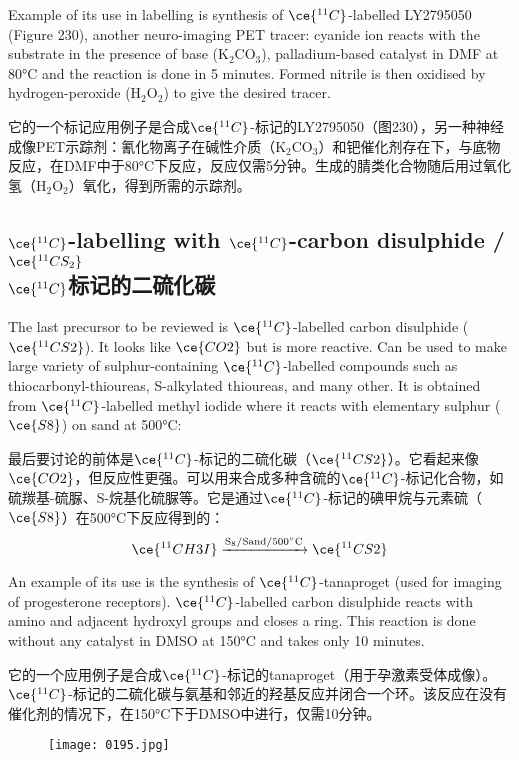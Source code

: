 \documentclass[dvipsnames, svgnames,a4paper,11pt]{article}
\begin{document}
Example of its use in labelling is synthesis of \(\ce{^{11}C}\)-labelled LY2795050 (Figure 230), another neuro-imaging PET tracer: cyanide ion reacts with the substrate in the presence of base (K\(_2\)CO\(_3\)), palladium-based catalyst in DMF at 80°C and the reaction is done in 5 minutes. Formed nitrile is then oxidised by hydrogen-peroxide (H\(_2\)O\(_2\)) to give the desired tracer.

它的一个标记应用例子是合成\(\ce{^{11}C}\)-标记的LY2795050（图230），另一种神经成像PET示踪剂：氰化物离子在碱性介质（K\(_2\)CO\(_3\)）和钯催化剂存在下，与底物反应，在DMF中于80°C下反应，反应仅需5分钟。生成的腈类化合物随后用过氧化氢（H\(_2\)O\(_2\)）氧化，得到所需的示踪剂。

\subsection{\(\ce{^{11}C}\)-labelling with \(\ce{^{11}C}\)-carbon disulphide / \(\ce{^{11}CS_2}\)  \\  \(\ce{^{11}C}\)标记的二硫化碳 }  


The last precursor to be reviewed is \(\ce{^{11}C}\)-labelled carbon disulphide (\(\ce{^{11}CS2}\)). It looks like \(\ce{CO2}\) but is more reactive. Can be used to make large variety of sulphur-containing \(\ce{^{11}C}\)-labelled compounds such as thiocarbonyl-thioureas, S-alkylated thioureas, and many other. It is obtained from \(\ce{^{11}C}\)-labelled methyl iodide where it reacts with elementary sulphur (\(\ce{S8}\)) on sand at 500°C:

最后要讨论的前体是\(\ce{^{11}C}\)-标记的二硫化碳（\(\ce{^{11}CS2}\)）。它看起来像\(\ce{CO2}\)，但反应性更强。可以用来合成多种含硫的\(\ce{^{11}C}\)-标记化合物，如硫羰基-硫脲、S-烷基化硫脲等。它是通过\(\ce{^{11}C}\)-标记的碘甲烷与元素硫（\(\ce{S8}\)）在500°C下反应得到的：  
\[
\ce{^{11}CH3I} \xrightarrow{\mathrm{S_8/Sand/500^\circ C}} \ce{^{11}CS2}
\]

An example of its use is the synthesis of \(\ce{^{11}C}\)-tanaproget (used for imaging of progesterone receptors). \(\ce{^{11}C}\)-labelled carbon disulphide reacts with amino and adjacent hydroxyl groups and closes a ring. This reaction is done without any catalyst in DMSO at 150°C and takes only 10 minutes.

它的一个应用例子是合成\(\ce{^{11}C}\)-标记的tanaproget（用于孕激素受体成像）。\(\ce{^{11}C}\)-标记的二硫化碳与氨基和邻近的羟基反应并闭合一个环。该反应在没有催化剂的情况下，在150°C下于DMSO中进行，仅需10分钟。

\begin{figure}[h]
	\centering
    \texttt{[image: 0195.jpg]}  
     \label{fig231}
\end{figure}
\end{document}
